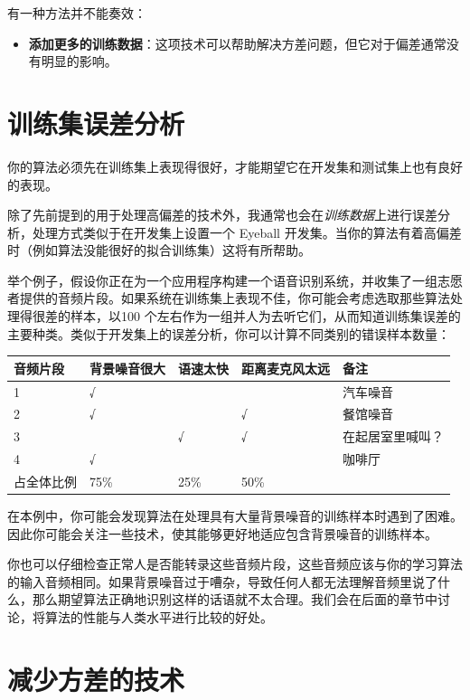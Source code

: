 有一种方法并不能奏效：

\begin{itemize}
\tightlist
\item
  \textbf{添加更多的训练数据}：这项技术可以帮助解决方差问题，但它对于偏差通常没有明显的影响。
\end{itemize}

\hypertarget{ux8badux7ec3ux96c6ux8befux5deeux5206ux6790}{%
\chapter{训练集误差分析}\label{ux8badux7ec3ux96c6ux8befux5deeux5206ux6790}}

你的算法必须先在训练集上表现得很好，才能期望它在开发集和测试集上也有良好的表现。

除了先前提到的用于处理高偏差的技术外，我通常也会在\emph{训练数据}上进行误差分析，处理方式类似于在开发集上设置一个
Eyeball
开发集。当你的算法有着高偏差时（例如算法没能很好的拟合训练集）这将有所帮助。

举个例子，假设你正在为一个应用程序构建一个语音识别系统，并收集了一组志愿者提供的音频片段。如果系统在训练集上表现不佳，你可能会考虑选取那些算法处理得很差的样本，以100
个左右作为一组并人为去听它们，从而知道训练集误差的主要种类。类似于开发集上的误差分析，你可以计算不同类别的错误样本数量：

\begin{longtable}[]{@{}lllll@{}}
\toprule
音频片段 & 背景噪音很大 & 语速太快 & 距离麦克风太远 & 备注 \\
\midrule
\endhead
1 & √ & & & 汽车噪音 \\
2 & √ & & √ & 餐馆噪音 \\
3 & & √ & √ & 在起居室里喊叫？ \\
4 & √ & & & 咖啡厅 \\
占全体比例 & 75\% & 25\% & 50\% & \\
\bottomrule
\end{longtable}

在本例中，你可能会发现算法在处理具有大量背景噪音的训练样本时遇到了困难。因此你可能会关注一些技术，使其能够更好地适应包含背景噪音的训练样本。

你也可以仔细检查正常人是否能转录这些音频片段，这些音频应该与你的学习算法的输入音频相同。如果背景噪音过于嘈杂，导致任何人都无法理解音频里说了什么，那么期望算法正确地识别这样的话语就不太合理。我们会在后面的章节中讨论，将算法的性能与人类水平进行比较的好处。

\hypertarget{ux51cfux5c11ux65b9ux5deeux7684ux6280ux672f}{%
\chapter{减少方差的技术}\label{ux51cfux5c11ux65b9ux5deeux7684ux6280ux672f}}

